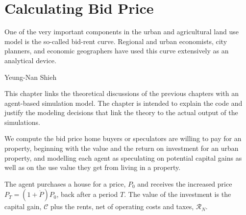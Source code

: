 \chapter[Bidding]{Calculating Bid Price}
\label{appendix-bid-price}
\epigraph{One of the very important components in the urban and agricultural land use model is the so-called \gls{bid-rent curve}. Regional and urban economists, city planners, and economic geographers have used this curve extensively as an analytical device.}{Yeung-Nan Shieh\cite{shiehWilhelmLaunhardtBidRent2004}}


This chapter links the theoretical discussions of the previous chapters with an agent-based simulation model. The chapter is intended to explain the code and justify the modeling decisions that link the theory to the actual output of the simulations.

 We compute the bid price home buyers or speculators are willing to pay for an property, beginning with the value and the return on investment for an urban property, and modelling each agent as %
 speculating on potential \glspl{capital gain} as well as on the \gls{use value} they get from living in a property. %

 The agent purchases a house for a price, $P_0$ %
 and receives the increased price $P_T = (1 + \dot P)P_0$, back after a period $T$. 
The value of the investment is the capital gain, $\mathcal{C}$ plus the rents, net of operating costs and taxes, $\mathcal{R}_N$.



